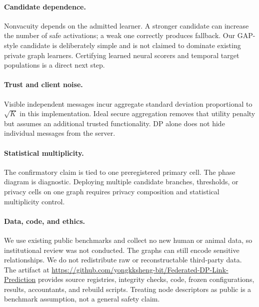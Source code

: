 \paragraph{Candidate dependence.}
Nonvacuity depends on the admitted learner. A stronger candidate can increase
the number of safe activations; a weak one correctly produces fallback. Our
GAP-style candidate is deliberately simple and is not claimed to dominate
existing private graph learners. Certifying learned neural scorers and
temporal target populations is a direct next step.

\paragraph{Trust and client noise.}
Visible independent messages incur aggregate standard deviation proportional
to $\sqrt K$ in this implementation. Ideal secure aggregation removes that
utility penalty but assumes an additional trusted functionality. DP alone
does not hide individual messages from the server.

\paragraph{Statistical multiplicity.}
The confirmatory claim is tied to one preregistered primary cell. The phase
diagram is diagnostic. Deploying multiple candidate branches, thresholds, or
privacy cells on one graph requires privacy composition and statistical
multiplicity control.

\paragraph{Data, code, and ethics.}
We use existing public benchmarks and collect no new human or animal data, so
institutional review was not conducted. The graphs can still encode sensitive
relationships. We do not redistribute raw or reconstructable third-party
data. The artifact at
\url{https://github.com/yongkksheng-bit/Federated-DP-Link-Prediction}
provides source registries, integrity checks, code, frozen configurations,
results, accountants, and rebuild scripts. Treating node descriptors as public
is a benchmark assumption, not a general safety claim.
